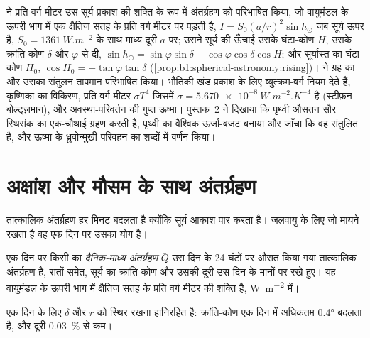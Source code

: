 \begin{recall}
 ने प्रति वर्ग मीटर उस सूर्य-प्रकाश की शक्ति के रूप में अंतर्ग्रहण को परिभाषित किया, जो वायुमंडल के ऊपरी भाग में एक क्षैतिज सतह के प्रति वर्ग मीटर पर पड़ती है, $I = S_0(a/r)^2\sin h_\odot$ जब सूर्य ऊपर है, $S_0 = \qty{1361}{W.m^{-2}}$ के साथ माध्य दूरी $a$ पर; उसने सूर्य की ऊँचाई उसके घंटा-कोण $H$, उसके क्रांति-कोण $\delta$ और  $\varphi$ से दी,
$\sin h_\odot = \sin\varphi\sin\delta + \cos\varphi\cos\delta\cos H$; और सूर्यास्त का घंटा-कोण $H_0$, $\cos H_0 = -\tan\varphi\tan\delta$ (\cref{prop:b1:spherical-astronomy:rising})।  ने ग्रह का  और उसका संतुलन तापमान परिभाषित किया। भौतिकी खंड प्रकाश के लिए व्युत्क्रम-वर्ग नियम देते हैं, कृष्णिका का विकिरण, प्रति वर्ग मीटर $\sigma T^4$ जिसमें $\sigma = \qty{5.670e-8}{W.m^{-2}.K^{-4}}$ है (स्टीफ़न–बोल्ट्ज़मान), और अवस्था-परिवर्तन की गुप्त ऊष्मा। पुस्तक~2 ने दिखाया कि पृथ्वी औसतन सौर स्थिरांक का एक-चौथाई ग्रहण करती है, पृथ्वी का वैश्विक ऊर्जा-बजट बनाया और जाँचा कि वह संतुलित है, और ऊष्मा के ध्रुवोन्मुखी परिवहन का शब्दों में वर्णन किया।
\end{recall}

\section{अक्षांश और मौसम के साथ अंतर्ग्रहण}\label{sec:b1:radiation-heat-transport:insolation}

तात्कालिक अंतर्ग्रहण हर मिनट बदलता है क्योंकि सूर्य आकाश पार करता है। जलवायु के लिए जो मायने रखता है वह एक दिन पर उसका योग है।

\begin{definition}[दैनिक-माध्य अंतर्ग्रहण]\label{def:b1:radiation-heat-transport:daily-insolation}
एक दिन पर किसी  का \emph{दैनिक-माध्य अंतर्ग्रहण} $\bar Q$ उस दिन के 24 घंटों पर औसत किया गया तात्कालिक अंतर्ग्रहण है, रातों समेत, सूर्य का क्रांति-कोण और उसकी दूरी उस दिन के मानों पर रखे हुए। यह वायुमंडल के ऊपरी भाग में क्षैतिज सतह के प्रति वर्ग मीटर की शक्ति है, \unit{W.m^{-2}} में।
\end{definition}

एक दिन के लिए $\delta$ और $r$ को स्थिर रखना हानिरहित है: क्रांति-कोण एक दिन में अधिकतम \ang{0.4} बदलता है, और दूरी \qty{0.03}{\percent} से कम।

